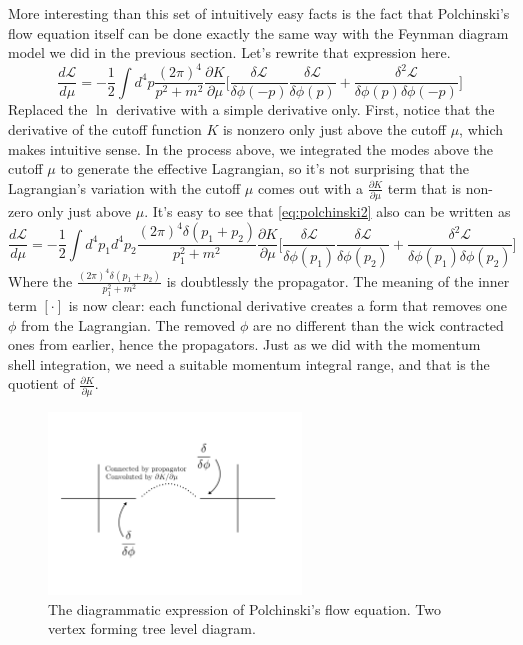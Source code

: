 \documentclass[12pt,halfline,a4paper]{ouparticle}
\begin{document}
More interesting than this set of intuitively easy facts is the fact that Polchinski's flow equation itself can be done exactly the same way with the Feynman diagram model we did in the previous section. Let's rewrite that expression here. 
\begin{equation}
	\label{eq:polchinski2}
	\frac{d\mathcal L}{d\mu}=-\frac{1}{2}\int d^4p\frac{(2\pi)^4}{p^2+m^2}\frac{\partial K}{\partial\mu}\bigg[\frac{\delta \mathcal L}{\delta \phi(-p)}\frac{\delta \mathcal L}{\delta \phi(p)}+\frac{\delta^2 \mathcal L}{\delta \phi(p)\delta \phi(-p)}\bigg]
\end{equation}
Replaced the $\ln$ derivative with a simple derivative only. First, notice that the derivative of the cutoff function $K$ is nonzero only just above the cutoff $\mu$, which makes intuitive sense. In the process above, we integrated the modes above the cutoff $\mu$ to generate the effective Lagrangian, so it's not surprising that the Lagrangian's variation with the cutoff $\mu$ comes out with a $\frac{\partial K}{\partial \mu}$ term that is non-zero only just above $\mu$.
It's easy to see that \ref{eq:polchinski2} also can be written as
\begin{equation}
	\frac{d\mathcal L}{d\mu}=-\frac{1}{2}\int d^4p_1d^4p_2\frac{(2\pi)^4\delta(p_1+p_2)}{p_1^2+m^2}\frac{\partial K}{\partial\mu}\bigg[\frac{\delta \mathcal L}{\delta \phi(p_1)}\frac{\delta \mathcal L}{\delta \phi(p_2)}+\frac{\delta^2 \mathcal L}{\delta \phi(p_1)\delta \phi(p_2)}\bigg]
\end{equation}
Where the $\frac{(2\pi)^4\delta(p_1+p_2)}{p_1^2+m^2}$ is doubtlessly the propagator. 
The meaning of the inner term $[\cdot]$ is now clear: each functional derivative creates a form that removes one $\phi$ from the Lagrangian. The removed $\phi$ are no different than the wick contracted ones from earlier, hence the propagators. Just as we did with the momentum shell integration, we need a suitable momentum integral range, and that is the quotient of $\frac{\partial K}{\partial \mu}$.
\begin{figure}[h!]
	\centering
	\includegraphics[width=0.6\textwidth]{Fig5.jpeg}
	\caption{The diagrammatic expression of Polchinski's flow equation. Two vertex forming tree level diagram.}
	\label{fig:polchinski}
\end{figure}
\end{document}
